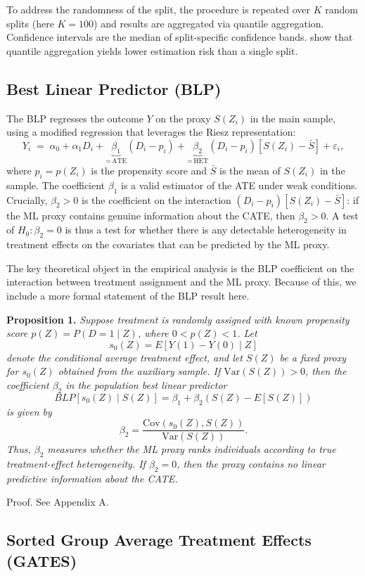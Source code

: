 \documentclass[11pt]{article}
\begin{document}
To address the randomness of the split, the procedure is repeated over $K$
random splits (here $K=100$) and results are aggregated via quantile
aggregation.
Confidence
intervals are the median of split-specific confidence bands.
\citet{chernozhukov2025} show that quantile aggregation yields lower
estimation risk than a single split.

\subsection{Best Linear Predictor (BLP)}
The BLP regresses the outcome $Y$ on the proxy $S(Z_i)$ in the main sample,
using a modified regression that leverages the Riesz representation:
\[
Y_i \;=\; \alpha_0 + \alpha_1 D_i + \underbrace{\beta_1}_{=\,\text{ATE}} (D_i - p_i) + \underbrace{\beta_2}_{=\,\text{HET}} (D_i - p_i)[S(Z_i) - \bar S] + \varepsilon_i,
\]
where $p_i = p(Z_i)$ is the propensity score and $\bar S$ is the mean of
$S(Z_i)$ in the sample. The coefficient $\beta_1$ is a valid estimator of the
ATE under weak conditions. Crucially, $\beta_2 > 0$ is the coefficient on the
interaction $(D_i-p_i)[S(Z_i)-\bar{S}]$: if the ML proxy contains genuine
information about the CATE, then $\beta_2 > 0$. A test of $H_0:\beta_2=0$
is thus a test for whether there is any detectable heterogeneity in treatment effects on the covariates
that can be predicted by the ML proxy.

The key theoretical object in the empirical analysis is the BLP coefficient on the interaction between treatment assignment and the ML proxy. Because of this, we include a more formal statement of the BLP result here.

\textbf{Proposition 1.} \textit{Suppose treatment is randomly assigned with known propensity score
$p(Z)=P(D=1\mid Z)$, where $0<p(Z)<1$. Let
\[
s_0(Z)=E[Y(1)-Y(0)\mid Z]
\]
denote the conditional average treatment effect, and let $S(Z)$ be a fixed proxy for $s_0(Z)$ obtained from the auxiliary sample. If $\mathrm{Var}(S(Z))>0$, then the coefficient $\beta_2$ in the population best linear predictor
\[
BLP[s_0(Z)\mid S(Z)]
=
\beta_1+\beta_2(S(Z)-E[S(Z)])
\]
is given by
\[
\beta_2=
\frac{\mathrm{Cov}(s_0(Z),S(Z))}{\mathrm{Var}(S(Z))}.
\]
Thus, $\beta_2$ measures whether the ML proxy ranks individuals according to true treatment-effect heterogeneity. If $\beta_2=0$, then the proxy contains no linear predictive information about the CATE.}

Proof. See Appendix A.

\subsection{Sorted Group Average Treatment Effects (GATES)}
\end{document}
